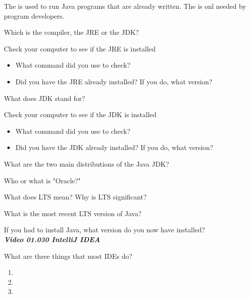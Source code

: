 \documentclass[letterpaper,11pt]{exam}
\begin{document}
\begin{questions}
\question The \makebox[4em]{\hrulefill} is used to run Java programs that are already written.  The \makebox[4em]{\hrulefill} is onl needed by program developers.

\question Which is the compiler, the JRE or the JDK? \makebox[4em]{\hrulefill}

\begin{samepage}
\question Check your computer to see if the JRE is installed
\begin{itemize}
    \item What command did you use to check?
    \item Did you have the JRE already installed?  If you do, what version?
\end{itemize}
\end{samepage}

\question What does JDK stand for? 

\begin{samepage}
    \question Check your computer to see if the JDK is installed
    \begin{itemize}
        \item What command did you use to check?
        \item Did you have the JDK already installed?  If you do, what version?
    \end{itemize}
    \end{samepage}
    
 \question What are the two main distributions of the Java JDK?
 
 \question Who or what is "Oracle?"
 \vspace{1cm}

 \question What does LTS mean?  Why is LTS significant?
 \vspace{1.5cm}

 \question What is the most recent LTS version of Java?

 \question If you had to install Java, what version do you now have installed?
 \vspace{1cm}\\
 \textit{\textbf{Video 01.030 IntelliJ IDEA}}

\begin{samepage}
    \question What are three things that most IDEs do?
    
        \begin{enumerate}
         \item 
         \item 
         \item 
        \end{enumerate}
\end{samepage}


\end{questions}
\end{document}

